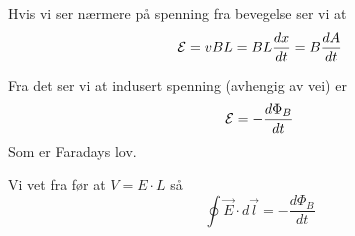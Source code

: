 Hvis vi ser nærmere på spenning fra bevegelse ser vi at
$$\mathcal{E} = vBL
  = B L \frac{dx}{dt}
  = B \frac{dA}{dt}$$

Fra det ser vi at indusert spenning (avhengig av vei) er
$$\mathcal{E} = - \frac{d\Phi_B}{dt}$$
Som er Faradays lov.

Vi vet fra før at $V=E\cdot L$ så
$$\oint \vec{E}\cdot d\vec{l} = - \frac{d\Phi_B}{dt}$$
